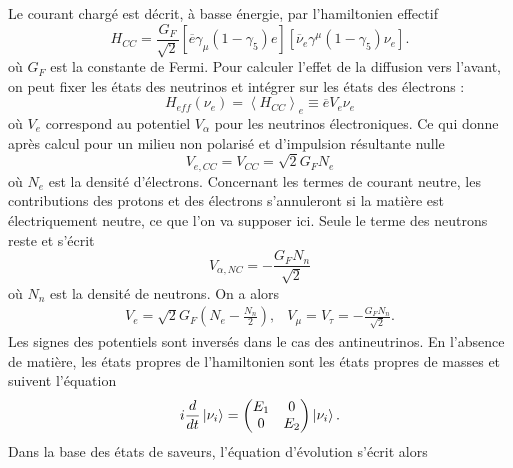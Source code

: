             Le courant chargé est décrit, à basse énergie, par l'hamiltonien effectif\cite{Akhmedov2000}
            \begin{equation}
                H_{CC} = \frac{G_F}{\sqrt{2}}\left[\overline{e}\gamma_{\mu}(1-\gamma_5)e\right]\left[\overline{\nu}_e\gamma^{\mu}(1-\gamma_5)\nu_e\right].
            \end{equation}
            où $G_F$ est la constante de Fermi. Pour calculer l'effet de la diffusion vers l'avant, on peut fixer les états des neutrinos et intégrer sur les états des électrons : 
            \begin{equation}
                H_{eff}(\nu_e) = \left<H_{CC}\right>_{e} \equiv \overline{e}V_e\nu_e
            \end{equation}
            où $V_e$ correspond au potentiel $V_{\alpha}$ pour les neutrinos électroniques. Ce qui donne après calcul pour un milieu non polarisé et d'impulsion résultante nulle\cite{Akhmedov2000}
            \begin{equation}
                V_{e,CC} = V_{CC} = \sqrt{2}G_F N_e
            \end{equation}
            où $N_e$ est la densité d'électrons. Concernant les termes de courant neutre, les contributions des protons et des électrons s'annuleront si la matière est électriquement neutre, ce que l'on va supposer ici. Seule le terme des neutrons reste et s'écrit 
            \begin{equation}
                V_{\alpha,NC} = -\frac{G_F N_n}{\sqrt{2}}
            \end{equation}
            où $N_n$ est la densité de neutrons. On a alors 
            \begin{eqnarray}
                V_e = \sqrt{2}G_F\left(N_e-\frac{N_n}{2}\right), & V_{\mu} = V_{\tau} = -\frac{G_F N_n}{\sqrt{2}}.
            \end{eqnarray}
            Les signes des potentiels sont inversés dans le cas des antineutrinos.
            En l'absence de matière, les états propres de l'hamiltonien sont les états propres de masses et suivent l'équation
            \begin{equation}
                i\frac{d}{dt}\ket{\nu_i} = \left(\begin{matrix}E_1 & 0 \\ 0 & E_2\end{matrix}\right)\ket{\nu_i}.
            \end{equation}
            Dans la base des états de saveurs, l'équation d'évolution s'écrit alors
